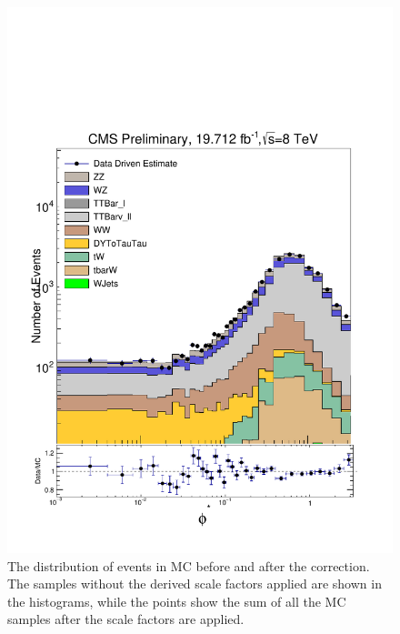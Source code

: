 \begin{figure}[!htbp]
    \centering
    \includegraphics[width=\textwidth]{figures/emu_check.pdf}
    \caption[
        The \phistar distribution of \Ztomumu events in MC before and after the
        \emu correction.
    ]{
        The \phistar distribution of \Ztomumu events in MC before and after the
        \emu correction. The samples without the \emu derived scale factors
        applied are shown in the histograms, while the points show the sum of
        all the MC samples after the scale factors are applied.
    }
    \label{fig:emu_after_correction}
\end{figure}


